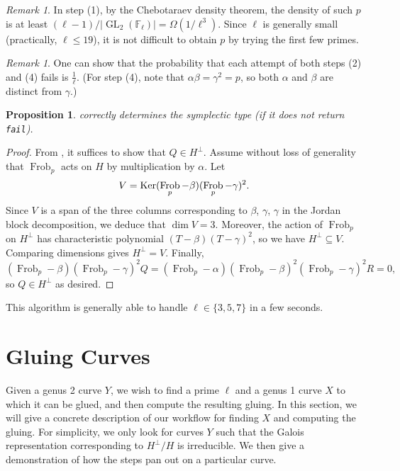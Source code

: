 \documentclass{amsproc}
\numberwithin{equation}{section}
\newtheorem{proposition}[equation]{Proposition}
\theoremstyle{definition}
\theoremstyle{remark}
\newtheorem{remark}[equation]{Remark}
\DeclareMathOperator{\GL}{GL}
\DeclareMathOperator{\Frob}{Frob}
\newcommand{\FF}{\mathbb F}
\begin{document}
\begin{remark}
    In step (1), by the Chebotaraev density theorem, 
    the density of such $p$ is at least 
    $(\ell-1)/|\GL_2(\FF_\ell)| = \Omega(1/\ell^3)$.
    Since $\ell$ is generally small (practically, $\ell\leq 19$), it is not difficult 
    to obtain $p$ by trying the first few primes.
\end{remark}
\begin{remark}
    One can show that the probability that each attempt of both steps (2) and (4) fails is $\tfrac 1{\ell}$. (For step (4), note that $\alpha\beta = \gamma^2 = p$, so both $\alpha$ and $\beta$ are distinct from $\gamma$.)
\end{remark}
\begin{proposition}
     correctly determines the symplectic type (if it does not return \texttt{fail}).
\end{proposition}
\begin{proof}
From ,
it suffices to show that $Q\in H^\perp$.
Assume without loss of generality that $\Frob_p$ acts on $H$ by multiplication by $\alpha$. Let 
$$ V = \operatorname{Ker}(\Frob_p-\beta)\\(\Frob_p-\gamma)^2.$$
Since $V$ is a span of the three columns corresponding to $\beta$, $\gamma$, $\gamma$ in the Jordan block decomposition, we deduce that $\dim V = 3$.
Moreover, the action of $\Frob_p$ on $H^\perp$ has characteristic polynomial $(T-\beta)(T-\gamma)^2$, so we have $H^\perp\subseteq V$. Comparing dimensions gives $H^\perp = V$. Finally, %
\begin{equation}
    (\Frob_p-\beta)(\Frob_p-\gamma)^2 Q
= (\Frob_p-\alpha)(\Frob_p-\beta)^2(\Frob_p-\gamma)^2 R = 0,
\end{equation}
so $Q\in H^\perp$ as desired.
\end{proof}
This algorithm is generally able to handle $\ell\in\{3,5,7\}$ in a few seconds. 

\section{Gluing Curves}
\label{sec:gluing_algorithm}
Given a genus 2 curve $Y$, we wish to find a prime $\ell$ and a genus 1 curve $X$ to which it can be glued, and then compute the resulting gluing. In this section, we will give a concrete description of our workflow for finding $X$ and computing the gluing. For simplicity, we only look for curves $Y$ such that the Galois representation corresponding to $H^\perp/H$ is irreducible. We then give a demonstration of how the steps pan out on a particular curve.
\end{document}
